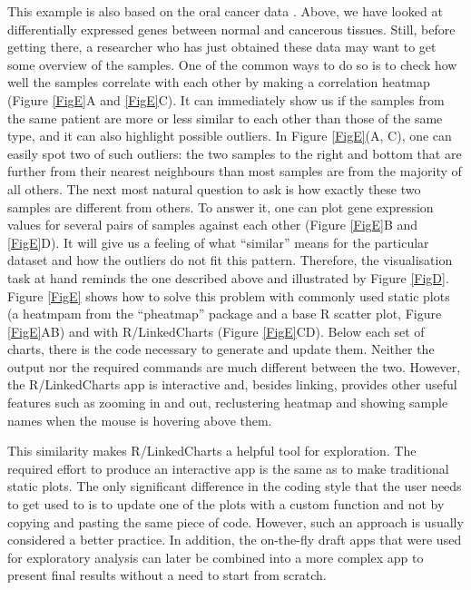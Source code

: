 \documentclass[twocolumn,10pt]{article}
\begin{document}
This example is also based on the oral cancer data \citep{conway_2015}. Above, we have looked at differentially expressed genes between normal and cancerous tissues. Still, before getting there, a researcher who has just obtained these data may want to get some overview of the samples. One of the common ways to do so is to check how well the samples correlate with each other by making a correlation heatmap (Figure \ref{FigE}A and \ref{FigE}C). It can immediately show us if the samples from the same patient are more or less similar to each other than those of the same type, and it can also highlight possible outliers. In Figure \ref{FigE}(A, C), one can easily spot two of such outliers: the two samples to the right and bottom that are further from their nearest neighbours than most samples are from the majority of all others. The next most natural question to ask is how exactly these two samples are different from others. To answer it, one can plot gene expression values for several pairs of samples against each other (Figure \ref{FigE}B and \ref{FigE}D). It will give us a feeling of what ``similar'' means for the particular dataset and how the outliers do not fit this pattern. Therefore, the visualisation task at hand reminds the one described above and illustrated by Figure \ref{FigD}. Figure \ref{FigE} shows how to solve this problem with commonly used static plots (a heatmpam from the ``pheatmap'' \citep{kolde_2019} package and a base R scatter plot, Figure \ref{FigE}AB) and with R/LinkedCharts (Figure \ref{FigE}CD). Below each set of charts, there is the code necessary to generate and update them. Neither the output nor the required commands are much different between the two. However, the R/LinkedCharts app is interactive and, besides linking, provides other useful features such as zooming in and out, reclustering heatmap and showing sample names when the mouse is hovering above them.

This similarity makes R/LinkedCharts a helpful tool for exploration. The required effort to produce an interactive app is the same as to make traditional static plots. The only significant difference in the coding style that the user needs to get used to is to update one of the plots with a custom function and not by copying and pasting the same piece of code. However, such an approach is usually considered a better practice. In addition, the on-the-fly draft apps that were used for exploratory analysis can later be combined into a more complex app to present final results without a need to start from scratch.
\end{document}
